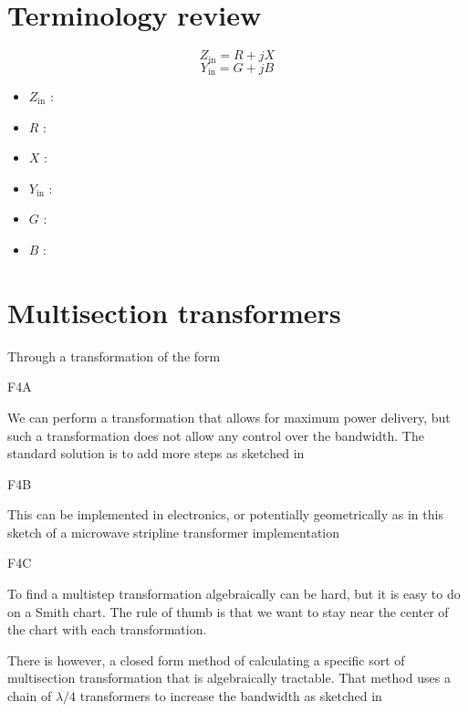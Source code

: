 
\section{Terminology review}

\begin{equation}\label{eqn:uwavesDeck7MultisectionTransformersCore:20}
Z_{\textrm{in}} = R + j X
\end{equation}
\begin{equation}\label{eqn:uwavesDeck7MultisectionTransformersCore:40}
Y_{\textrm{in}} = G + j B
\end{equation}

\begin{itemize}
\item \( Z_{\textrm{in}} \) : 
\item \( R \) : 
\item \( X \) : 
\item \( Y_{\textrm{in}} \) : 
\item \( G \) : 
\item \( B \) : 
\end{itemize}

\section{Multisection transformers}

Through a transformation of the form

F4A

We can perform a transformation that allows for maximum power delivery, but such a transformation does not allow any control over the bandwidth.  The standard solution is to add more steps as sketched in

F4B

This can be implemented in electronics, or potentially geometrically as in this sketch of a microwave stripline transformer implementation

F4C

To find a multistep transformation algebraically can be hard, but it is easy to do on a Smith chart.  The rule of thumb is that we want to stay near the center of the chart with each transformation.

There is however, a closed form method of calculating a specific sort of multisection transformation that is algebraically tractable.  That method uses a chain of \( \lambda/4 \) transformers to increase the bandwidth as sketched in 

